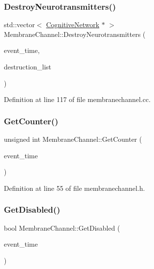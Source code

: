 \subsubsection{\texorpdfstring{Destroy\+Neurotransmitters()}{DestroyNeurotransmitters()}}
{\footnotesize\ttfamily std\+::vector$<$ \mbox{\hyperlink{class_cognitive_network}{Cognitive\+Network}} $\ast$ $>$ Membrane\+Channel\+::\+Destroy\+Neurotransmitters (\begin{DoxyParamCaption}\item[{std\+::chrono\+::time\+\_\+point$<$ \mbox{\hyperlink{universe_8h_a0ef8d951d1ca5ab3cfaf7ab4c7a6fd80}{Clock}} $>$}]{event\+\_\+time,  }\item[{std\+::vector$<$ \mbox{\hyperlink{class_cognitive_network}{Cognitive\+Network}} $\ast$$>$}]{destruction\+\_\+list }\end{DoxyParamCaption})}



Definition at line 117 of file membranechannel.\+cc.

\mbox{\label{class_membrane_channel_ac856b74d47b28bd8638fce9c0f12dd20}} 
\subsubsection{\texorpdfstring{Get\+Counter()}{GetCounter()}}
{\footnotesize\ttfamily unsigned int Membrane\+Channel\+::\+Get\+Counter (\begin{DoxyParamCaption}\item[{std\+::chrono\+::time\+\_\+point$<$ \mbox{\hyperlink{universe_8h_a0ef8d951d1ca5ab3cfaf7ab4c7a6fd80}{Clock}} $>$}]{event\+\_\+time }\end{DoxyParamCaption})\hspace{0.3cm}{\ttfamily [inline]}}



Definition at line 55 of file membranechannel.\+h.

\mbox{\label{class_membrane_channel_afde030429a160621a2255ab8a2d689b8}} 
\subsubsection{\texorpdfstring{Get\+Disabled()}{GetDisabled()}}
{\footnotesize\ttfamily bool Membrane\+Channel\+::\+Get\+Disabled (\begin{DoxyParamCaption}\item[{std\+::chrono\+::time\+\_\+point$<$ \mbox{\hyperlink{universe_8h_a0ef8d951d1ca5ab3cfaf7ab4c7a6fd80}{Clock}} $>$}]{event\+\_\+time }\end{DoxyParamCaption})\hspace{0.3cm}{\ttfamily [inline]}}



